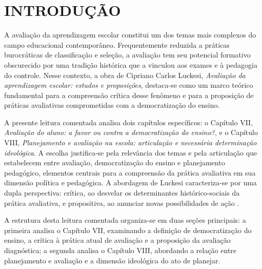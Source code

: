
\chapter{INTRODUÇÃO}
\label{chap:introducao}

A avaliação da aprendizagem escolar constitui um dos temas mais complexos do campo educacional contemporâneo. Frequentemente reduzida a práticas burocráticas de classificação e seleção, a avaliação tem seu potencial formativo obscurecido por uma tradição histórica que a vinculou aos exames e à pedagogia do controle. Nesse contexto, a obra de Cipriano Carlos Luckesi, \textit{Avaliação da aprendizagem escolar: estudos e proposições}, destaca-se como um marco teórico fundamental para a compreensão crítica desse fenômeno e para a proposição de práticas avaliativas comprometidas com a democratização do ensino.

A presente leitura comentada analisa dois capítulos específicos: o Capítulo VII, \textit{Avaliação do aluno: a favor ou contra a democratização do ensino?}, e o Capítulo VIII, \textit{Planejamento e avaliação na escola: articulação e necessária determinação ideológica}. A escolha justifica-se pela relevância dos temas e pela articulação que estabelecem entre avaliação, democratização do ensino e planejamento pedagógico, elementos centrais para a compreensão da prática avaliativa em sua dimensão política e pedagógica. A abordagem de Luckesi caracteriza-se por uma dupla perspectiva: crítica, ao desvelar os determinantes histórico-sociais da prática avaliativa, e propositiva, ao anunciar novas possibilidades de ação \cite{luckesi-avaprend}.

A estrutura desta leitura comentada organiza-se em duas seções principais: a primeira analisa o Capítulo VII, examinando a definição de democratização do ensino, a crítica à prática atual de avaliação e a proposição da avaliação diagnóstica; a segunda analisa o Capítulo VIII, abordando a relação entre planejamento e avaliação e a dimensão ideológica do ato de planejar.

